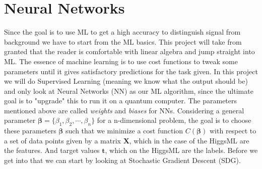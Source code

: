 \documentclass[14pt, a4paper]{book}
\begin{document}
\graphicspath{{../../figures/}}

\section{Neural Networks}
Since the goal is to use ML to get a high accuracy to distinguish signal from background we have to start from the ML basics.  This project will take from granted that the reader is comfortable with linear algebra and jump straight into ML. The essence of machine learning is to use cost functions to tweak some parameters until it gives satisfactory predictions for the task given. In this project we will do Supervised Learning (meaning we know what the output should be) and only look at Neural Networks (NN) as our ML algorithm, since the ultimate goal is to "upgrade" this to run it on a quantum computer. The parameters mentioned above are called \textit{weights} and \textit{biases} for NNs. Considering a general parameter $\bm{\beta} = \{\beta_1,\beta_2,\cdots,\beta_n\}$ for a n-dimensional problem, the goal is to choose these parameters $\bm{\beta}$ such that we minimize a cost function $C(\bm{\beta})$ with respect to a set of data points given by a matrix $\mathbf{X}$, which in the case of the HiggsML are the features. And target values $\mathbf{t}$, which on the HiggsML are the labels. Before we get into that we can start by looking at Stochastic Gradient Descent (SDG).
\end{document}
